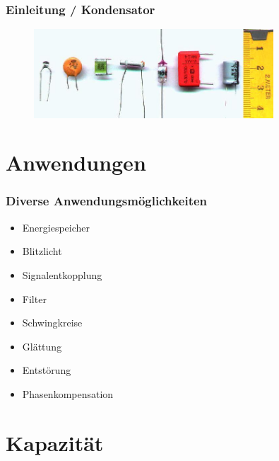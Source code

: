 \begin{frame}
  \frametitle{Einleitung / Kondensator}

  \begin{center}
    \begin{figure}
      \includegraphics[width=0.8\textwidth,height=.75\textheight,keepaspectratio]{e05/Kondensator02.jpg}
    \end{figure}
  \end{center}
\end{frame}

\section*{Anwendungen}
\begin{frame}
  \frametitle{Diverse Anwendungsmöglichkeiten}
  \pause
  \begin{itemize}
    \item Energiespeicher
    \item Blitzlicht
    \item Signalentkopplung
    \item Filter
    \item Schwingkreise
    \item Glättung
    \item Entstörung
    \item Phasenkompensation
  \end{itemize}
\end{frame}


\section*{Kapazität}

